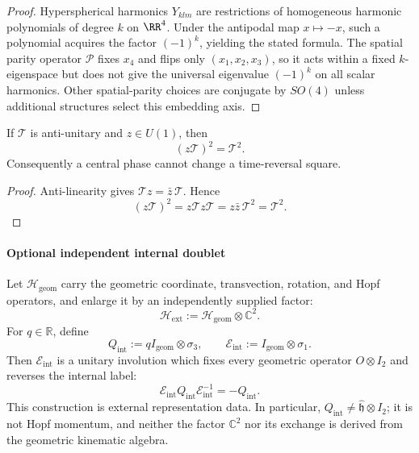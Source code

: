 \documentclass[11pt,a4paper]{article}
\begin{document}
\begin{proof}
Hyperspherical harmonics $Y_{klm}$ are restrictions of homogeneous harmonic polynomials of degree $k$ on $\RR^4$. Under the antipodal map $x\mapsto -x$, such a polynomial acquires the factor $(-1)^k$, yielding the stated formula. The spatial parity operator $\mathcal P$ fixes $x_4$ and flips only $(x_1,x_2,x_3)$, so it acts within a fixed $k$-eigenspace but does not give the universal eigenvalue $(-1)^k$ on all scalar harmonics.  Other spatial-parity choices are conjugate by $SO(4)$ unless additional structures select this embedding axis.
\end{proof}
\begin{lemma}
\label{p2:lem:antiunitary-phase-square}
If \(\mathcal T\) is anti-unitary and \(z\in U(1)\), then
\[
        (z\mathcal T)^2=\mathcal T^2.
\]
Consequently a central phase cannot change a time-reversal square.
\end{lemma}

\begin{proof}
Anti-linearity gives \(\mathcal T z=\bar z\,\mathcal T\).  Hence
\[
 (z\mathcal T)^2
 =z\mathcal T z\mathcal T
 =z\bar z\,\mathcal T^2
 =\mathcal T^2.
\]
\end{proof}
\paragraph{Optional independent internal doublet}

\begin{proposition}
\label{p2:prop:independent-internal-doublet}
Let \(\mathcal H_{\mathrm{geom}}\) carry the geometric coordinate,
transvection, rotation, and Hopf operators, and enlarge it by an independently
supplied factor:
\[
        \mathcal H_{\mathrm{ext}}
        :=\mathcal H_{\mathrm{geom}}\otimes\mathbb C^2.
\]
For \(q\in\mathbb R\), define
\[
        Q_{\mathrm{int}}
        :=qI_{\mathrm{geom}}\otimes\sigma_3,
        \qquad
        \mathcal E_{\mathrm{int}}
        :=I_{\mathrm{geom}}\otimes\sigma_1.
\]
Then \(\mathcal E_{\mathrm{int}}\) is a unitary involution which fixes every
geometric operator \(O\otimes I_2\) and reverses the internal label:
\[
 \mathcal E_{\mathrm{int}}Q_{\mathrm{int}}
 \mathcal E_{\mathrm{int}}^{-1}=-Q_{\mathrm{int}}.
\]
This construction is external representation data.  In particular,
\(Q_{\mathrm{int}}\neq\hat{\mathfrak h}\otimes I_2\); it is not Hopf
momentum, and neither the factor \(\mathbb C^2\) nor its exchange is derived
from the geometric kinematic algebra.
\end{proposition}
\end{document}
